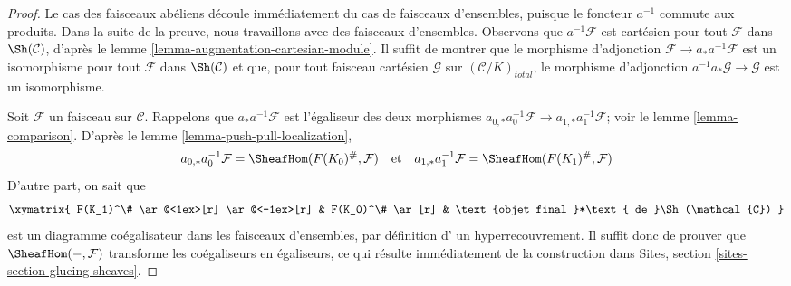 \begin{proof}
Le cas des faisceaux abéliens découle immédiatement du cas
de faisceaux d'ensembles, puisque le foncteur $a^{-1}$ commute aux produits.
Dans la suite de la preuve, nous travaillons avec des faisceaux d'ensembles.
Observons que $a^{-1}\mathcal{F}$ est cartésien pour
tout $\mathcal{F}$ dans $\Sh(\mathcal{C})$, d'après le
lemme \ref{lemma-augmentation-cartesian-module}.
Il suffit de montrer que le morphisme d'adjonction
$\mathcal{F} \to a_*a^{-1}\mathcal{F}$
est un isomorphisme pour tout $\mathcal{F}$ dans $\Sh(\mathcal{C})$
et que, pour tout faisceau cartésien
$\mathcal{G}$ sur $(\mathcal{C}/K)_{total}$,
le morphisme d'adjonction
$a^{-1}a_*\mathcal{G} \to \mathcal{G}$ est un isomorphisme.

\medskip\noindent
Soit $\mathcal{F}$ un faisceau sur $\mathcal{C}$.
Rappelons que $a_*a^{-1}\mathcal{F}$ est l'égaliseur
des deux morphismes $a_{0, *}a_0^{-1}\mathcal{F} \to a_{1, *}a_1^{-1}\mathcal{F}$;
voir le lemme \ref{lemma-comparison}.
D'après le lemme \ref{lemma-push-pull-localization},
$$
a_{0, *}a_0^{-1}\mathcal{F} = \SheafHom(F(K_0)^\#, \mathcal{F})
\quad\text{et}\quad
a_{1, *}a_1^{-1}\mathcal{F} = \SheafHom(F(K_1)^\#, \mathcal{F})
$$
D'autre part, on sait que
$$
\xymatrix{
F(K_1)^\# \ar@<1ex>[r] \ar@<-1ex>[r] &
F(K_0)^\# \ar[r] & \text{objet final }*\text{ de }\Sh(\mathcal{C})
}
$$
est un diagramme coégalisateur dans les faisceaux d'ensembles, par définition d'
un hyperrecouvrement. Il suffit donc de prouver
que $\SheafHom(-, \mathcal{F})$ transforme les coégaliseurs
en égaliseurs, ce qui résulte immédiatement de la construction
dans Sites, section \ref{sites-section-glueing-sheaves}.


\end{proof}

